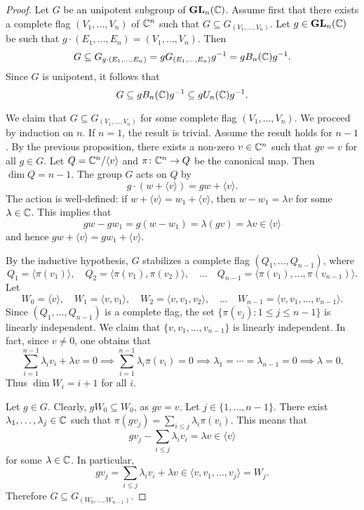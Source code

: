 \begin{proof}
    Let $G$ be an unipotent subgroup of $\mathbf{GL}_n(\mathbb{C})$. 
    Assume first that there exists
    a complete flag $(V_1,\dots,V_n)$ of $\mathbb{C}^n$
    such that $G\subseteq G_{(V_1,\dots,V_n)}$. Let $g\in\mathbf{GL}_n(\mathbb{C})$ be such that 
    $g\cdot (E_1,\dots,E_n)=(V_1,\dots,V_n)$. Then 
    \begin{gather*}
        G\subseteq G_{g\cdot (E_1,\dots,E_n)}
        =g G_{(E_1,\dots,E_n)}g^{-1}=gB_n(\mathbb{C})g^{-1}.
    \end{gather*}
    Since $G$ is unipotent, it follows that 
    \[
    G\subseteq gB_n(\mathbb{C})g^{-1}\subseteq gU_n(\mathbb{C})g^{-1}.
    \]
    
    We claim that $G\subseteq G_{(V_1,\dots,V_n)}$ for
    some complete flag $(V_1,\dots,V_n)$. We proceed by induction on $n$. If $n=1$, the result is trivial. Assume the result holds for 
    $n-1$. By the previous proposition, there exists a non-zero $v\in\mathbb{C}^n$ 
    such that $gv=v$ for all $g\in G$. Let $Q=\mathbb{C}^n/\langle v\rangle$ and $\pi\colon \mathbb{C}^n\to Q$ be the canonical map. Then $\dim Q=n-1$. The group $G$ 
    acts on $Q$ by
    \[
    g\cdot (w+\langle v\rangle)=gw+\langle v\rangle.
    \]
    The action is well-defined: if $w+\langle v\rangle=w_1+\langle v\rangle$, then 
    $w-w_1=\lambda v$ for some $\lambda\in\mathbb{C}$. This implies
    that 
    \[
    gw-gw_1=g(w-w_1)=\lambda(gv)=\lambda v\in \langle v\rangle
    \]
    and hence $gw+\langle v\rangle=gw_1+\langle v\rangle$. 
    
    By the inductive hypothesis, $G$ stabilizes
    a complete flag $(Q_1,\dots,Q_{n-1})$, where
    \[
    Q_1=\langle\pi(v_1)\rangle,
    \quad
    Q_2=\langle\pi(v_1),\pi(v_2)\rangle,
    \quad
    \dots
    \quad
    Q_{n-1}=\langle\pi(v_1),\dots,\pi(v_{n-1})\rangle.
    \]
    Let 
    \[
    W_0=\langle v\rangle,
    \quad
    W_1=\langle v,v_1\rangle,
    \quad
    W_2=\langle v,v_1,v_2\rangle,
    \quad\dots\quad 
    W_{n-1}=\langle v,v_1,\dots,v_{n-1}\rangle.
    \]
    Since $(Q_1,\dots,Q_{n-1})$ is a complete flag, 
    the set $\{\pi(v_j):1\leq j\leq n-1\}$ is linearly
    independent. We claim that 
    $\{v,v_1,\dots,v_{n-1}\}$ is linearly independent. In fact, since $v\ne 0$, one obtains that 
    \[
    \sum_{i=1}^{n-1}\lambda_iv_i+\lambda v=0
    \implies
    \sum_{i=1}^{n-1}\lambda_i\pi(v_i)=0
    \implies 
    \lambda_1=\cdots=\lambda_{n-1}=0
    \implies
    \lambda=0.
    \]
    Thus $\dim W_i=i+1$ for all $i$. 
    
    Let $g\in G$. 
    Clearly, 
    $gW_0\subseteq W_0$, as $gv=v$. Let $j\in\{1,\dots,n-1\}$.
    There exist $\lambda_1,\dots,\lambda_j\in\mathbb{C}$ 
    such that 
    $\pi(gv_j)=\sum_{i\leq j}\lambda_i\pi(v_i)$. This means
    that 
    \[
    gv_j-\sum_{i\leq j}\lambda_iv_i=\lambda v\in\langle v\rangle
    \]
    for some $\lambda\in\mathbb{C}$. In particular, 
    \[
    gv_j=\sum_{i\leq j}\lambda_iv_i+\lambda v\in\langle v,v_1,\dots,v_{j}\rangle=W_j.
    \]
    Therefore $G\subseteq G_{(W_0,\dots,W_{n-1})}$. 
\end{proof}


